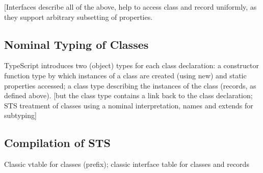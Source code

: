 [Interfaces describe all of the above, help to access class and record uniformly, as they support arbitrary subsetting of properties.


\subsection{Nominal Typing of Classes}

TypeScript introduces two (object) types for each class declaration: a constructor function type by which instances of a class are
created (using new) and static properties accessed; a class type describing the instances of the class (records, as defined above). 
[but the class type contains a link back to the class declaration;  STS treatment of classes using a nominal interpretation, names 
and extends for subtyping]


\subsection{Compilation of STS}

Classic vtable for classes (prefix); classic interface table for classes and records
